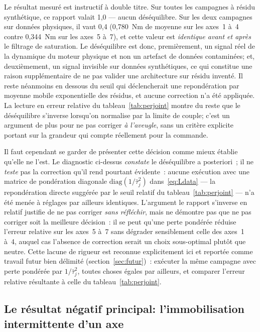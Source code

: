 \documentclass[a4paper, oneside]{article}
\begin{document}
Le résultat mesuré est instructif à double titre. Sur toutes les campagnes à
résidu synthétique, ce rapport valait 1{,}0 — aucun déséquilibre. Sur les deux
campagnes sur données physiques, il vaut 0{,}4 (0{,}780~Nm de moyenne sur les
axes~1 à~4 contre 0{,}344~Nm sur les axes~5 à~7), et cette valeur est
\emph{identique avant et après} le filtrage de saturation. Le déséquilibre est
donc, premièrement, un signal réel de la dynamique du moteur physique et non un
artefact de données contaminées; et, deuxièmement, un signal invisible sur
données synthétiques, ce qui constitue une raison supplémentaire de ne pas
valider une architecture sur résidu inventé. Il reste néanmoins en dessous du
seuil qui déclencherait une repondération par moyenne mobile exponentielle des
résidus, et aucune correction n'a été appliquée. La lecture en erreur relative
du tableau~\ref{tab:perjoint} montre du reste que le déséquilibre s'inverse
lorsqu'on normalise par la limite de couple; c'est un argument de plus pour ne
pas corriger \emph{à l'aveugle}, sans un critère explicite portant sur la
grandeur qui compte réellement pour la commande.

Il faut cependant se garder de présenter cette décision comme mieux établie
qu'elle ne l'est. Le diagnostic ci-dessus \emph{constate} le déséquilibre a
posteriori~; il ne \emph{teste} pas la correction qu'il rend pourtant
évidente~: aucune exécution avec une matrice de pondération diagonale
$\mathrm{diag}(1/\bar{\tau}_j^2)$ dans~\eqref{eq:Ldata} — la repondération
directe suggérée par le seuil relatif du tableau~\ref{tab:perjoint} — n'a été
menée à réglages par ailleurs identiques. L'argument \og le rapport
s'inverse en relatif \fg{} justifie de ne pas corriger \emph{sans réfléchir},
mais ne démontre pas que ne pas corriger soit la meilleure décision~: il se
peut qu'une perte pondérée réduise l'erreur relative sur les axes~5 à~7 sans
dégrader sensiblement celle des axes~1 à~4, auquel cas l'absence de correction
serait un choix sous-optimal plutôt que neutre. Cette lacune de rigueur est
reconnue explicitement ici et reportée comme travail futur bien délimité
(section~\ref{sec:futur})~: exécuter la même campagne avec perte pondérée par
$1/\bar{\tau}_j^2$, toutes choses égales par ailleurs, et comparer l'erreur
relative résultante à celle du tableau~\ref{tab:perjoint}.

\subsection{Le résultat négatif principal: l'immobilisation intermittente
d'un axe}
\label{sec:disc-freeze}
\end{document}
